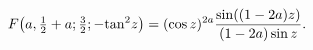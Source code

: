 \[\mathop{F\/}\nolimits\!\left(a,\tfrac{1}{2}+a;\tfrac{3}{2};-{\mathop{\tan\/}%
\nolimits^{2}}z\right)=(\mathop{\cos\/}\nolimits z)^{2a}\frac{\mathop{\sin\/}%
\nolimits\!\left((1-2a)z\right)}{(1-2a)\mathop{\sin\/}\nolimits z}.\]